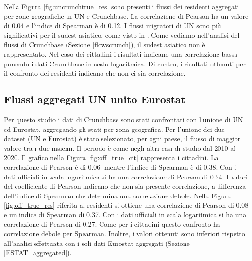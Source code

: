 Nella Figura \ref{fig:uncrunchtrue_res} sono presenti i flussi dei residenti aggregati per zone geografiche in UN e Crunchbase. La correlazione di Pearson ha un valore di 0.04 e l'indice di Spearman è di 0.12.
I flussi migratori di UN sono più significativi per il sudest asiatico, come visto in \cite{MIMIDOC}. Come vediamo nell'analisi del flussi di Crunchbase (Sezione \ref{flowscrunch}), il sudest asiatico non è rappresentato.
Nel caso dei cittadini i risultati indicano una correlazione bassa ponendo i dati Crunchbase in scala logaritmica. Di contro, i risultati ottenuti per il confronto dei residenti indicano che non ci sia correlazione.

\FloatBarrier
\subsection{Flussi aggregati UN unito Eurostat}
\label{UNunionEstatflows}
Per questo studio i dati di Crunchbase sono stati confrontati con l'unione di UN ed Eurostat, aggregando gli stati per zona geografica. Per l'unione dei due dataset (UN e Eurostat) è stato selezionato, per ogni paese, il flusso di maggior valore tra i due insiemi. Il periodo è come negli altri casi di studio dal 2010 al 2020.
Il grafico nella Figura \ref{fig:off_true_cit} rappresenta i cittadini. La correlazione di Pearson è di 0.06, mentre l'indice di Spearman è di 0.38. Con i dati ufficiali in scala logaritmica si ha una correlazione di Pearson di 0.24. I valori del coefficiente di Pearson indicano che non sia presente correlazione, a differenza dell'indice di Spearman che determina una correlazione debole.
Nella Figura \ref{fig:off_true_res} riferita ai residenti si ottiene una correlazione di Pearson di 0.08 e un indice di Spearman di 0.37. Con i dati ufficiali in scala logaritmica si ha una correlazione di Pearson di 0.27. Come per i cittadini questo confronto ha correlazione debole per Spearman. Inoltre, i valori ottenuti sono inferiori rispetto all'analisi effettuata con i soli dati Eurostat aggregati (Sezione \ref{ESTAT_aggregated}). 

